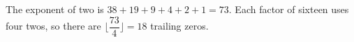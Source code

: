 The exponent of two is $38+19+9+4+2+1=73$. Each factor of sixteen uses four twos, so there are $\lfloor\dfrac{73}{4}\rfloor=\boxed{18}$ trailing zeros.
